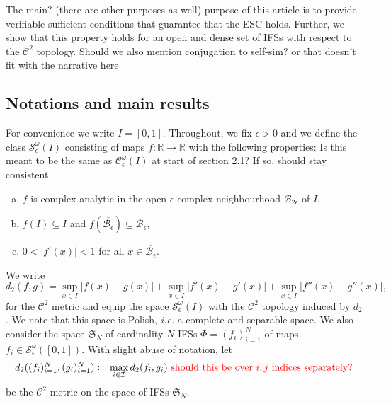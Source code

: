 \documentclass[12pt,]{article}
\theoremstyle{definition}
\theoremstyle{remark}
\newcommand{\0}{\mathbf{0}}
\newcommand{\ie}{{\it i.e.}\/ }
\begin{document}
The {\color{red} main? (there are other purposes as well)} purpose of this article is to provide verifiable sufficient conditions that guarantee that the
ESC holds. Further, we show that this property holds for an open and dense set of IFSs with respect to the
$\mathcal{C}^2$ topology. {\color{red} Should we also mention conjugation to self-sim? or that doesn't fit with the narrative here}

\subsection{Notations and main results}
For convenience we write $I=[0,1]$.
Throughout, we fix $\epsilon>0$ and  we define the class $\mathcal{S}^\omega_\epsilon(I)$
consisting of maps $f:\mathbb{R}\to\mathbb{R}$ with the following properties: {\color{red} Is this meant to be the same as $\mathcal{C}^\omega_\epsilon(I)$ at start of section 2.1? If so, should stay consistent}
\begin{enumerate}[a)]
  \item\label{it:a} $f$ is complex analytic in the open $\epsilon$ complex neighbourhood
    $\mathcal{B}_{2\epsilon}$ of  $I$,
  \item\label{it:b} $f(I) \subseteq I$ and $f(\overline{\mathcal{B}_{\epsilon}}) \subseteq
    \mathcal{B}_{\epsilon}$,
  \item\label{it:c} $0<|f'(x)|<1$ for all $x\in\overline{\mathcal{B}_{\epsilon}}$.
\end{enumerate}
We write
\[
  d_2(f,g) = \sup_{x\in I} |f(x)-g(x)|+\sup_{x\in I} |f'(x)-g'(x)| +\sup_{x\in I} |f''(x)-g''(x)|,
\]
for the $\mathcal{C}^2$ metric and equip the space $\mathcal{S}^\omega_\epsilon(I)$ with the
$\mathcal{C}^2$ topology induced by $d_2$. We note that this space is Polish, \ie a complete
and separable space.
We also consider the space $\mathfrak{S}_N$ of cardinality $N$ IFSs $\Phi=(f_i)_{i=1}^N$ of maps $f_i\in
\mathcal{S}^\omega_\epsilon([0,1])$. With slight abuse of notation, let
$$
d_2((f_i)_{i=1}^N,(g_i)_{i=1}^N)\coloneqq\max_{i\in\mathcal{I}}d_2(f_i,g_i) {\color{red} \text{ should this be over } i,j \text{ indices separately?}}
$$
be the $\mathcal{C}^2$ metric on the space of IFSs $\mathfrak{S}_N$.
\end{document}
